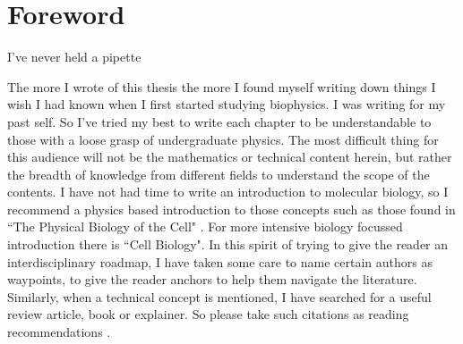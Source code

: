 \chapter*{Foreword}
\label{chap:foreword}
\begin{chapquote} {}
I've never held a pipette
\end{chapquote}

The more I wrote of this thesis the more I found myself writing down things I wish I had known when I first started studying biophysics. I was writing for my past self. So I've tried my best to write each chapter to be understandable to those with a loose grasp of undergraduate physics. The most difficult thing for this audience will not be the mathematics or technical content herein, but rather the breadth of knowledge from different fields to understand the scope of the contents. I have not had time to write an introduction to molecular biology, so I recommend a physics based introduction to those concepts such as those found in ``The Physical Biology of the Cell" \cite{phillips2012}. For more intensive biology focussed introduction there is ``Cell Biology"\cite{pollard2016}. In this spirit of trying to give the reader an interdisciplinary roadmap, I have taken some care to name certain authors as waypoints, to give the reader anchors to help them navigate the literature. Similarly, when a technical concept is mentioned, I have searched for a useful review article, book or explainer. So please take such citations as reading recommendations \cite{dawkins1989, hofstadter1999}.

